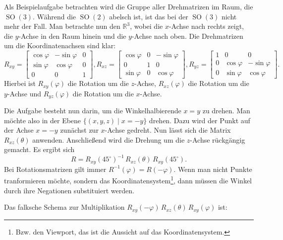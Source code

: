 \documentclass[a4paper,11pt,fleqn,twoside]{scrartcl}
\numberwithin{equation}{section}
\newcommand{\R}{\mathbb R}
\begin{document}
Als Beispielaufgabe betrachten wird die Gruppe aller Drehmatrizen
im Raum, die $\operatorname{SO}(3)$. Während die $\operatorname{SO}(2)$
abelsch ist, ist das bei der $\operatorname{SO}(3)$ nicht mehr
der Fall. Man betrachte nun den $\R^3$, wobei die $x$-Achse nach
rechts zeigt, die $y$-Achse in den Raum hinein und die $y$-Achse
nach oben. Die Drehmatrizen um die Koordinatenachsen sind klar:
\begin{equation}
R_{xy} = \begin{bmatrix}
\cos\varphi & -\sin\varphi & 0\\
\sin\varphi & \cos\varphi & 0\\
0 & 0 & 1
\end{bmatrix},
R_{xz} = \begin{bmatrix}
\cos\varphi & 0 & -\sin\varphi\\
0 & 1 & 0\\
\sin\varphi & 0 & \cos\varphi
\end{bmatrix},
R_{yz} = \begin{bmatrix}
1 & 0 & 0\\
0 & \cos\varphi & -\sin\varphi\\
0 & \sin\varphi & \cos\varphi
\end{bmatrix}.
\end{equation}
Hierbei ist $R_{xy}(\varphi)$ die Rotation um die $z$-Achse,
$R_{xz}(\varphi)$ die Rotation um die $y$-Achse und
$R_{yz}(\varphi)$ die Rotation um die $x$-Achse.

Die Aufgabe besteht nun darin, um die Winkelhalbierende $x=y$ zu
drehen. Man möchte also in der Ebene $\{(x,y,z)\mid x=-y\}$ drehen.
Dazu wird der Punkt auf der Achse $x=-y$ zunächst zur $x$-Achse
gedreht. Nun lässt sich die Matrix $R_{xz}(\theta)$ anwenden.
Anschließend wird die Drehung um die $z$-Achse rückgängig gemacht.
Es ergibt sich
\begin{equation}
R = R_{xy}(45^\circ)^{-1}\,R_{xz}(\theta)\,R_{xy}(45^\circ).
\end{equation}
Bei Rotationsmatrizen gilt immer $R^{-1}(\varphi)=R(-\varphi)$.
Wenn man nicht Punkte tranformieren möchte, sondern das
Koordinatensystem\footnote{Bzw. den Viewport, das ist die Aussicht
auf das Koordinatensystem.}, dann müssen die Winkel durch ihre
Negationen substituiert werden.

Das falksche Schema zur Multiplikation
$R_{xy}(-\varphi)\,R_{xz}(\theta)\,R_{xy}(\varphi)$ ist:
\end{document}
